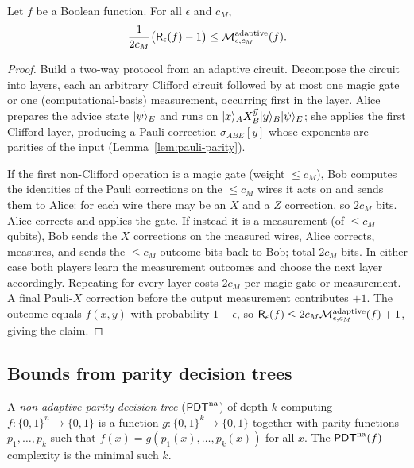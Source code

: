 \begin{theorem}
  \label{thm:r-adaptive}
  Let $f$ be a Boolean function. For all $\epsilon$ and $c_M$,
  \[
    \frac{1}{2 c_M}\big(\mathsf{R}_\epsilon(f) - 1\big) \le \mathcal{M}^{\mathrm{adaptive}}_{\epsilon,c_M}(f).
  \]
\end{theorem}
\begin{proof}
  Build a two-way protocol from an adaptive circuit. Decompose the circuit into
  layers, each an arbitrary Clifford circuit followed by at most one magic gate or
  one (computational-basis) measurement, occurring first in the layer. Alice
  prepares the advice state $\lvert \psi\rangle_E$ and runs on
  $\lvert x\rangle_A X_B^{\vec y}\lvert y\rangle_B\lvert \psi\rangle_E$; she applies the first Clifford
  layer, producing a Pauli correction $\sigma_{ABE}[y]$ whose exponents are
  parities of the input (Lemma~\ref{lem:pauli-parity}).

  If the first non-Clifford operation is a magic gate (weight $\le c_M$), Bob
  computes the identities of the Pauli corrections on the $\le c_M$ wires it acts
  on and sends them to Alice: for each wire there may be an $X$ and a $Z$
  correction, so $2c_M$ bits. Alice corrects and applies the gate. If instead it
  is a measurement (of $\le c_M$ qubits), Bob sends the $X$ corrections on the
  measured wires, Alice corrects, measures, and sends the $\le c_M$ outcome bits
  back to Bob; total $2c_M$ bits. In either case both players learn the
  measurement outcomes and choose the next layer accordingly. Repeating for every
  layer costs $2c_M$ per magic gate or measurement. A final Pauli-$X$ correction
  before the output measurement contributes $+1$. The outcome equals $f(x,y)$ with
  probability $1-\epsilon$, so $\mathsf{R}_\epsilon(f) \le 2c_M
  \mathcal{M}^{\mathrm{adaptive}}_{\epsilon,c_M}(f)+1$, giving the claim.
\end{proof}

\subsection*{Bounds from parity decision trees}

\begin{definition}
  \label{def:pdt}
  A \emph{non-adaptive parity decision tree} ($\mathsf{PDT}^{\mathrm{na}}$) of depth $k$ computing
  $f:\{0,1\}^n\to\{0,1\}$ is a function $g:\{0,1\}^k\to\{0,1\}$ together with
  parity functions $p_1,\dots,p_k$ such that $f(x) = g(p_1(x),\dots,p_k(x))$ for
  all $x$. The $\mathsf{PDT}^{\mathrm{na}}(f)$ complexity is the minimal such $k$.
\end{definition}

